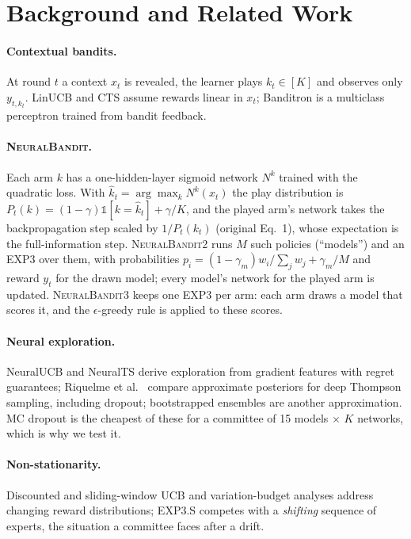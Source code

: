 \documentclass[sigconf]{acmart}
\newcommand{\NB}{\textsc{NeuralBandit}}
\begin{document}
\section{Background and Related Work}
\paragraph{Contextual bandits.} At round $t$ a context $x_t$ is revealed, the learner plays $k_t\in[K]$ and observes
only $y_{t,k_t}$. LinUCB \cite{li2010linucb} and CTS \cite{agrawal2013cts} assume rewards linear in $x_t$; Banditron
\cite{kakade2008banditron} is a multiclass perceptron trained from bandit feedback.

\paragraph{\NB{}.} Each arm $k$ has a one-hidden-layer sigmoid network $N^k$ trained with the quadratic loss. With
$\hat k_t=\arg\max_k N^k(x_t)$ the play distribution is $P_t(k)=(1-\gamma)\mathbb 1[k=\hat k_t]+\gamma/K$, and the
played arm's network takes the backpropagation step scaled by $1/P_t(k_t)$ (original Eq.~1), whose expectation is the
full-information step. \NB{}2 runs $M$ such policies (``models'') and an EXP3 over them, with probabilities
$p_i=(1-\gamma_m)w_i/\sum_j w_j+\gamma_m/M$ and reward $y_t$ for the drawn model; every model's network for the
played arm is updated. \NB{}3 keeps one EXP3 per arm: each arm draws a model that scores it, and the
$\epsilon$-greedy rule is applied to these scores.

\paragraph{Neural exploration.} NeuralUCB \cite{zhou2020neuralucb} and NeuralTS \cite{zhang2021neuralts} derive
exploration from gradient features with regret guarantees; Riquelme et al.\ \cite{riquelme2018showdown} compare
approximate posteriors for deep Thompson sampling, including dropout; bootstrapped ensembles
\cite{osband2016bootstrapped} are another approximation. MC dropout is the cheapest of these for a committee of 15
models $\times$ $K$ networks, which is why we test it.

\paragraph{Non-stationarity.} Discounted and sliding-window UCB \cite{garivier2011ucbswitching} and variation-budget
analyses \cite{besbes2014nonstationary} address changing reward distributions; EXP3.S \cite{auer2002nonstochastic}
competes with a \emph{shifting} sequence of experts, the situation a committee faces after a drift.
\end{document}

